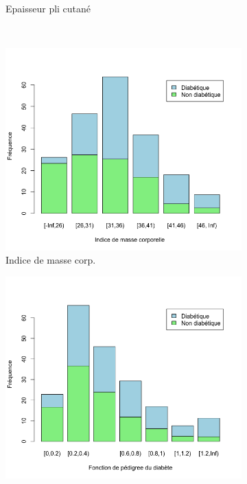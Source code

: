 \documentclass[a4paper,11pt]{report}
\begin{document}
\begin{figure}[H]
\begin{subfigure}[b]{0.25\linewidth}
		\caption{\scriptsize Epaisseur pli cutané}
		\label{fig:1-3-2-barplot-freq-diabete-pli-cutane}
	\end{subfigure}%
	\\
	\begin{subfigure}[b]{0.25\linewidth}
		\centering
		\captionsetup{justification=centering}
		\includegraphics[width=1\linewidth]{img/1-3-2-barplot-freq-diabete-ind-masse-corp}
		\caption{\scriptsize Indice de masse corp.}
		\label{fig:1-3-2-barplot-freq-diabete-ind-masse-corp}
	\end{subfigure}%
	\begin{subfigure}[b]{0.25\linewidth}
		\centering
		\captionsetup{justification=centering}
		\includegraphics[width=1\linewidth]{img/1-3-2-barplot-freq-diabete-pedigree}

\end{subfigure}
\end{figure}
\end{document}
